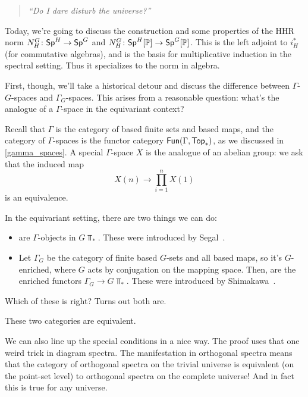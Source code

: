 \begin{quote}\textit{
	``Do I dare disturb the universe?''
}\end{quote}
Today, we're going to discuss the construction and some properties of the HHR norm $N_H^G\colon \mathsf{Sp}^H\to\mathsf{Sp}^G$
and $N_H^G\colon \mathsf{Sp}^H[\mathbb P]\to\mathsf{Sp}^G[\mathbb P]$. This is the left adjoint to $i_H^*$ (for commutative algebras), and is
the basis for multiplicative induction in the spectral setting. Thus it specializes to the norm in algebra.

First, though, we'll take a historical detour and discuss the difference between $\Gamma$-$G$-spaces and
$\Gamma_G$-spaces. This arises from a reasonable question: what's the analogue of a $\Gamma$-space in the
equivariant context?

Recall that $\Gamma$ is the category of based finite sets and based maps, and the category of $\Gamma$-spaces is
the functor category $\mathsf{Fun}(\Gamma, \mathsf{Top}_*)$, as we discussed in \cref{gamma_spaces}. A special $\Gamma$-space $X$
is the analogue of an abelian group: we ask that the induced map
\[X(n)\longrightarrow\prod_{i=1}^n X(1)\]
is an equivalence.

In the equivariant setting, there are two things we can do:
\begin{itemize}
	\item {} are $\Gamma$-objects in $G\Top_*$. These were introduced by
	Segal~\cite{SegalEquivariant}.
	\item Let $\Gamma_G$ be the category of finite based $G$-sets and all based maps, so it's $G$-enriched, where
	$G$ acts by conjugation on the mapping space. Then,  are the enriched functors
	$\Gamma_G\to G\Top_*$. These were introduced by Shimakawa~\cite{Shi89}.
\end{itemize}
Which of these is right? Turns out both are.
\begin{thm}
\label{shimgamma}
These two categories are equivalent.
\end{thm}
We can also line up the special conditions in a nice way. The proof uses that one weird trick in diagram spectra.
The manifestation in orthogonal spectra means that the category of orthogonal spectra on the trivial universe is
equivalent (on the point-set level) to orthogonal spectra on the complete universe! And in fact this is true for
any universe.

